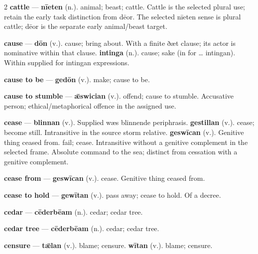 \begin{multicols}{2}
\textbf{cattle} — \textbf{nīeten} (n.). animal; beast; cattle. Cattle is the selected plural use; retain the early task distinction from dēor. The selected nīeten sense is plural cattle; dēor is the separate early animal/beast target.\par
\textbf{cause} — \textbf{dōn} (v.). cause; bring about. With a finite ðæt clause; its actor is nominative within that clause. \textbf{intinga} (n.). cause; sake (in for … intingan). Within supplied for intingan expressions.\par
\textbf{cause to be} — \textbf{gedōn} (v.). make; cause to be.\par
\textbf{cause to stumble} — \textbf{ǣswician} (v.). offend; cause to stumble. Accusative person; ethical/metaphorical offence in the assigned use.\par
\textbf{cease} — \textbf{blinnan} (v.). Supplied wæs blinnende periphrasis. \textbf{gestillan} (v.). cease; become still. Intransitive in the source storm relative. \textbf{geswīcan} (v.). Genitive thing ceased from. fail; cease. Intransitive without a genitive complement in the selected frame. Absolute command to the sea; distinct from cessation with a genitive complement.\par
\textbf{cease from} — \textbf{geswīcan} (v.). cease. Genitive thing ceased from.\par
\textbf{cease to hold} — \textbf{gewītan} (v.). pass away; cease to hold. Of a decree.\par
\textbf{cedar} — \textbf{cēderbēam} (n.). cedar; cedar tree.\par
\textbf{cedar tree} — \textbf{cēderbēam} (n.). cedar; cedar tree.\par
\textbf{censure} — \textbf{tǣlan} (v.). blame; censure. \textbf{wītan} (v.). blame; censure.\par

\end{multicols}
